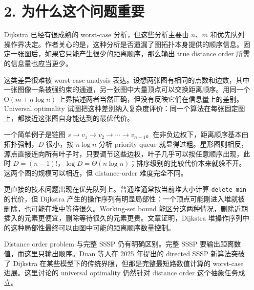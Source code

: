 \section*{2. 为什么这个问题重要}
Dijkstra 已经有很成熟的 worst-case 分析，但这些分析主要由 \(n\)、\(m\) 和优先队列操作界决定。作者关心的是，这种分析是否遗漏了图拓扑本身提供的顺序信息。固定一张图后，如果它只能产生很少的距离顺序，那么输出 true distance order 所需的信息量也应当更少。

这类差异很难被 worst-case analysis 表达。设想两张图有相同的点数和边数，其中一张图像一条被强约束的通道，另一张图中大量顶点可以交换距离顺序。用同一个 \(\mathrm{O}(m+n\log n)\) 上界描述两者当然正确，但没有反映它们在信息量上的差别。Universal optimality 试图把这种差别纳入复杂度评价：同一个算法在每张固定图上，都接近这张图自身能达到的最优代价。

一个简单例子是链图 \(s\to v_1\to v_2\to\cdots\to v_{n-1}\)。在非负边权下，距离顺序基本由拓扑强制，\(D\) 很小，按 \(n\log n\) 分析 priority queue 就显得过粗。星形图则相反，源点直接连向所有叶子时，只要调节这些边权，叶子几乎可以按任意顺序出现，此时 \(D=(n-1)!\)，\(\log D=\Theta(n\log n)\)；排序级别的比较代价本来就躲不开。这两个图的规模可以相近，但 distance-order 难度完全不同。

更直接的技术问题出现在优先队列上。普通堆通常按当前堆大小计算 \texttt{delete-\allowbreak{}min} 的代价，但 Dijkstra 产生的操作序列有明显局部性：一个顶点可能刚进入堆就被删除，也可能在堆中等待很久。Working-set bound 能区分这两种情况，删除近期插入的元素更便宜，删除等待很久的元素更贵。文章证明，Dijkstra 堆操作序列中的这种局部性最终可以由图中可能的距离顺序数量控制。

Distance order problem 与完整 SSSP 仍有明确区别。完整 SSSP 要输出距离数值，而这里只输出顺序。Duan 等人在 2025 年提出的 directed SSSP 新算法突破了 Dijkstra 在某些模型下的传统界限，但那是完整最短路数值计算的 worst-case 进展。这里讨论的 universal optimality 仍然针对 distance order 这个抽象任务成立。
